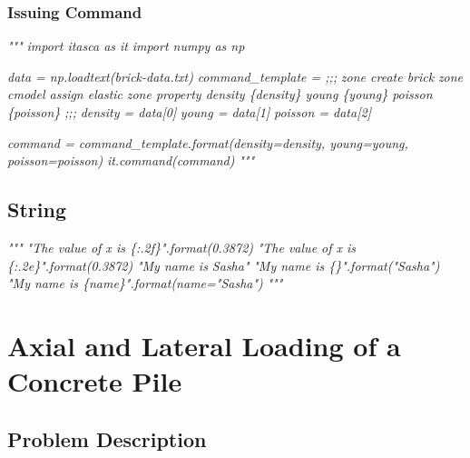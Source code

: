 \documentclass[a4paper, nobind]{templates/ociamthesis}
\newenvironment{Shaded}{\begin{snugshade}}{\end{snugshade}}
\newcommand{\CommentTok}[1]{\textcolor[rgb]{0.56,0.35,0.01}{\textit{#1}}}
\renewenvironment{Shaded}
{
  \vspace{10pt}%
  \begin{snugshade}%
}{%
  \end{snugshade}%
  \vspace{8pt}%
}
\begin{document}
\hypertarget{issuing-command}{%
\subsection{Issuing Command}\label{issuing-command}}

\begin{Shaded}
\begin{Highlighting}[]
\CommentTok{"""}
\CommentTok{import itasca as it}
\CommentTok{import numpy as np}

\CommentTok{data = np.loadtext(\textquotesingle{}brick{-}data.txt\textquotesingle{})}
\CommentTok{command\_template = ;;; }
\CommentTok{zone create brick}
\CommentTok{zone cmodel assign elastic}
\CommentTok{zone property density \{density\} young \{young\} poisson \{poisson\}}
\CommentTok{;;;}
\CommentTok{density = data[0]}
\CommentTok{young = data[1]}
\CommentTok{poisson = data[2]}

\CommentTok{command = command\_template.format(density=density, young=young, poisson=poisson)}
\CommentTok{it.command(command)}
\CommentTok{"""}
\end{Highlighting}
\end{Shaded}

\hypertarget{string}{%
\section{String}\label{string}}

\begin{Shaded}
\begin{Highlighting}[]
\CommentTok{"""}
\CommentTok{"The value of x is \{:.2f\}".format(0.3872)}
\CommentTok{"The value of x is \{:.2e\}".format(0.3872)}
\CommentTok{"My name is Sasha"}
\CommentTok{"My name is \{\}".format("Sasha")}
\CommentTok{"My name is \{name\}".format(name="Sasha")}
\CommentTok{"""}
\end{Highlighting}
\end{Shaded}

\newpage

\hypertarget{axial-and-lateral-loading-of-a-concrete-pile}{%
\chapter{Axial and Lateral Loading of a Concrete Pile}\label{axial-and-lateral-loading-of-a-concrete-pile}}

\hypertarget{problem-description-1}{%
\section{Problem Description}\label{problem-description-1}}
\end{document}
